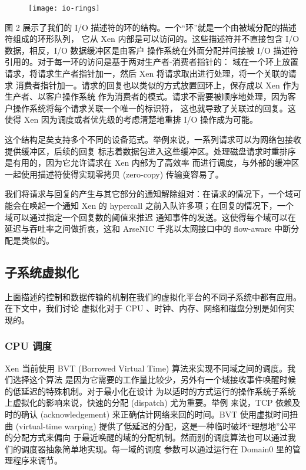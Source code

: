 \begin{figure}[h]
    \centering
    \texttt{[image: io-rings]}
\end{figure}

图 2 展示了我们的 I/O 描述符的环的结构。一个“环”就是一个由被域分配的描述符组成的环形队列，
它从 Xen 内部是可以访问的。这些描述符并不直接包含 I/O 数据，相反，I/O 数据缓冲区是由客户
操作系统在外面分配并间接被 I/O 描述符引用的。对于每一环的访问是基于两对生产者-消费者指针的：
域在一个环上放置请求，将请求生产者指针加一，然后 Xen 将请求取出进行处理，将一个关联的请求
消费者指针加一。请求的回复也以类似的方式放置回环上，保存成以 Xen 作为生产者、以客户操作系统
作为消费者的模式。请求不需要被顺序地处理，因为客户操作系统将每个请求关联一个唯一的标识符，
这也就导致了关联过的回复。这使得 Xen 因为调度或者优先级的考虑清楚地重排 I/O 操作成为可能。

这个结构足矣支持多个不同的设备范式。举例来说，一系列请求可以为网络包接收提供缓冲区，后续的回复
标志着数据包进入这些缓冲区。处理磁盘请求时重排序是有用的，因为它允许请求在 Xen 内部为了高效率
而进行调度，与外部的缓冲区一起使用描述符使得实现零拷贝 (zero-copy) 传输变容易了。

我们将请求与回复的产生与其它部分的通知解除组对：在请求的情况下，一个域可能会在唤起一个通知
Xen 的 hypercall 之前入队许多项；在回复的情况下，一个域可以通过指定一个回复数的阈值来推迟
通知事件的发送。这使得每个域可以在延迟与吞吐率之间做折衷，这和 ArseNIC 千兆以太网接口中的
flow-aware 中断分配是类似的。

\subsection{子系统虚拟化}

上面描述的控制和数据传输的机制在我们的虚拟化平台的不同子系统中都有应用。在下文中，我们讨论
虚拟化对于 CPU 、时钟、内存、网络和磁盘分别是如何实现的。

\subsubsection{CPU 调度}

Xen 当前使用 BVT (Borrowed Virtual Time) 算法来实现不同域之间的调度。我们选择这个算法
是因为它需要的工作量比较少，另外有一个域接收事件唤醒时候的低延迟的特殊机制。对于最小化在设计
为以适时的方式运行的操作系统子系统上虚拟化的影响来说，快速的分配 (dispatch) 尤为重要。举例
来说，TCP 依赖及时的确认 (acknowledgement) 来正确估计网络来回的时间。BVT 使用虚拟时间扭曲
(virtual-time warping) 提供了低延迟的分配，这是一种临时破坏“理想地”公平的分配方式来偏向
于最近唤醒的域的分配机制。然而别的调度算法也可以通过我们的调度器抽象简单地实现。每一域的调度
参数可以通过运行在 Domain0 里的管理程序来调节。

